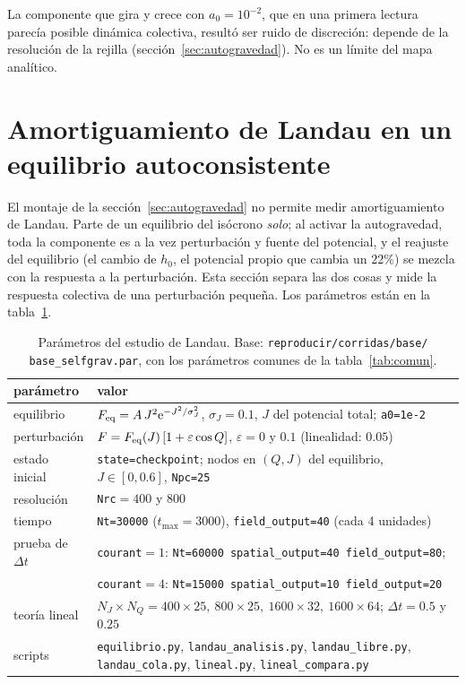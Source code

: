 \documentclass[11pt,a4paper]{article}
\newcommand{\ee}{\mathrm{e}}
\newcommand{\Jr}{J}
\newcommand{\Qr}{Q}
\theoremstyle{definition}
\begin{document}
La componente que gira y crece con $a_0=10^{-2}$, que en una primera lectura parecía
posible dinámica colectiva, resultó ser ruido de discreción: depende de la resolución
de la rejilla (sección~\ref{sec:autogravedad}). No es un límite del mapa analítico.

\section{Amortiguamiento de Landau en un equilibrio autoconsistente}
\label{sec:landaumedido}

El montaje de la sección~\ref{sec:autogravedad} no permite medir amortiguamiento de
Landau. Parte de un equilibrio del isócrono \emph{solo}; al activar la autogravedad,
toda la componente es a la vez perturbación y fuente del potencial, y el reajuste del
equilibrio (el cambio de $h_0$, el potencial propio que cambia un $22\%$) se mezcla con
la respuesta a la perturbación. Esta sección separa las dos cosas y mide la respuesta
colectiva de una perturbación pequeña. Los parámetros están en la
tabla~\ref{tab:landau}.

\begin{table}[ht]
\centering
\small
\caption{Parámetros del estudio de Landau. Base:
\texttt{reproducir/corridas/base/} \texttt{base\_selfgrav.par}, con los parámetros
comunes de la tabla~\ref{tab:comun}.}
\label{tab:landau}
\begin{tabular}{p{}p{}}
\toprule
parámetro & valor \\
\midrule
equilibrio & $F_{\rm eq}=A\,\Jr^2\ee^{-\Jr^2/\sigma_J^2}$, $\sigma_J=0.1$, $\Jr$ del potencial total; \texttt{a0=1e-2} \\
perturbación & $F=F_{\rm eq}(\Jr)\,[1+\varepsilon\cos\Qr]$, $\varepsilon=0$ y $0.1$ (linealidad: $0.05$) \\
estado inicial & \texttt{state=checkpoint}; nodos en $(\Qr,\Jr)$ del equilibrio, $\Jr\in[0,0.6]$, \texttt{Npc=25} \\
resolución & \texttt{Nrc}$=400$ y $800$ \\
tiempo & \texttt{Nt=30000} ($t_{\max}=3000$), \texttt{field\_output=40} (cada 4 unidades) \\
prueba de $\Delta t$ & \texttt{courant}$=1$: \texttt{Nt=60000 spatial\_output=40 field\_output=80}; \\
 & \texttt{courant}$=4$: \texttt{Nt=15000 spatial\_output=10 field\_output=20} \\
teoría lineal & $N_J\times N_Q = 400\times25,\ 800\times25,\ 1600\times32,\ 1600\times64$; $\Delta t=0.5$ y $0.25$ \\
\midrule
scripts & \texttt{equilibrio.py}, \texttt{landau\_analisis.py}, \texttt{landau\_libre.py}, \texttt{landau\_cola.py}, \texttt{lineal.py}, \texttt{lineal\_compara.py} \\
\bottomrule
\end{tabular}
\end{table}
\end{document}
